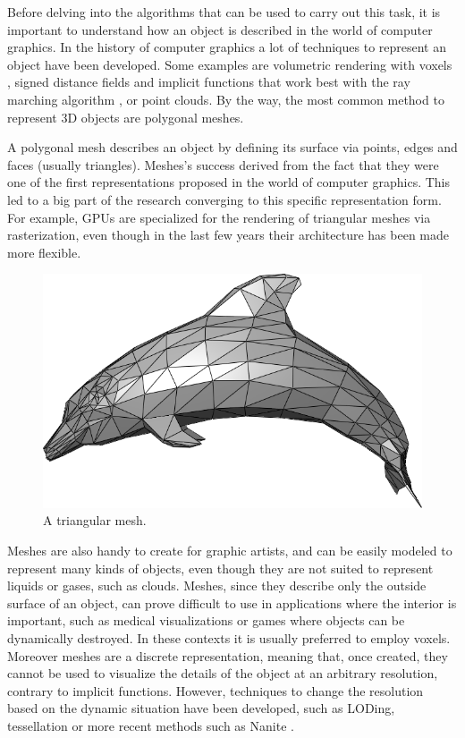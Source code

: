 \documentclass{PoliMi_MasterThesis}
\begin{document}
Before delving into the algorithms that can be used to carry out this task, it is important to understand how an object is described in the world of computer graphics. In the history of computer graphics a lot of techniques to represent an object have been developed. Some examples are volumetric rendering with voxels \cite{voxel_rendering}, signed distance fields \cite{sdf} and implicit functions that work best with the ray marching algorithm \cite{ray_marching}, or point clouds. By the way, the most common method to represent 3D objects are polygonal meshes.

A polygonal mesh describes an object by defining its surface via points, edges and faces (usually triangles). Meshes's success derived from the fact that they were one of the first representations proposed in the world of computer graphics. This led to a big part of the research converging to this specific representation form. For example, GPUs are specialized for the rendering of triangular meshes via rasterization, even though in the last few years their architecture has been made more flexible.

\begin{figure}[H]
    \centering
    \includegraphics[width=\textwidth*\real{0.5}]{Images/triangular_mesh.png}
    \caption{A triangular mesh.}
    \label{fig:triangular_mesh}
\end{figure}

Meshes are also handy to create for graphic artists, and can be easily modeled to represent many kinds of objects, even though they are not suited to represent liquids or gases, such as clouds. Meshes, since they describe only the outside surface of an object, can prove difficult to use in applications where the interior is important, such as medical visualizations or games where objects can be dynamically destroyed. In these contexts it is usually preferred to employ voxels. Moreover meshes are a discrete representation, meaning that, once created, they cannot be used to visualize the details of the object at an arbitrary resolution, contrary to implicit functions. However, techniques to change the resolution based on the dynamic situation have been developed, such as LODing, tessellation \cite{tessellation} or more recent methods such as Nanite \cite{nanite}.
\end{document}
